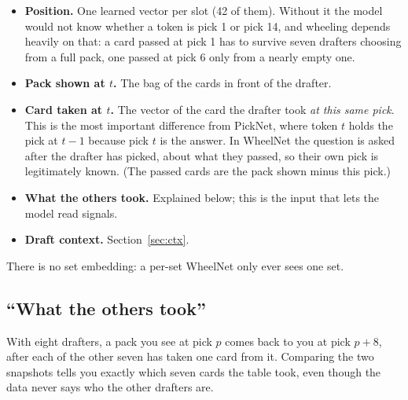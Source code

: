 \documentclass[11pt,letterpaper]{article}
\begin{document}
\begin{itemize}
\item \textbf{Position.} One learned vector per slot (42 of them). Without it the model would not know
whether a token is pick 1 or pick 14, and wheeling depends heavily on that: a card passed at pick 1 has to
survive seven drafters choosing from a full pack, one passed at pick 6 only from a nearly empty one.
\item \textbf{Pack shown at $t$.} The bag of the cards in front of the drafter.
\item \textbf{Card taken at $t$.} The vector of the card the drafter took \emph{at this same pick}. This is
the most important difference from PickNet, where token $t$ holds the pick at $t-1$ because pick $t$ is the
answer. In WheelNet the question is asked after the drafter has picked, about what they passed, so their
own pick is legitimately known. (The passed cards are the pack shown minus this pick.)
\item \textbf{What the others took.} Explained below; this is the input that lets the model read signals.
\item \textbf{Draft context.} Section~\ref{sec:ctx}.
\end{itemize}

There is no set embedding: a per-set WheelNet only ever sees one set.

\subsection{``What the others took''}

With eight drafters, a pack you see at pick $p$ comes back to you at pick $p+8$, after each of the other
seven has taken one card from it. Comparing the two snapshots tells you exactly which seven cards the
table took, even though the data never says who the other drafters are.
\end{document}
